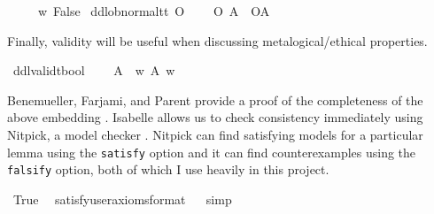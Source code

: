 \begin{isabellebody}
\ \ \ {\isachardoublequoteopen}\isactrlbold {\isasymbottom}\ {\isasymequiv}\ {\isasymlambda}w{\isachardot}\ False{\isachardoublequoteclose}\isanewline
{}\isamarkupfalse%
\ ddlob{\isacharunderscore}normal{\isacharcolon}{\isacharcolon}{\isachardoublequoteopen}t{\isasymRightarrow}t{\isachardoublequoteclose}\ {\isacharparenleft}{\isachardoublequoteopen}O\ {\isacharbraceleft}{\isacharunderscore}{\isacharbraceright}{\isachardoublequoteclose}{\isacharparenright}\isanewline
\ \ \ {\isachardoublequoteopen}{\isacharparenleft}O\ {\isacharbraceleft}A{\isacharbraceright}{\isacharparenright}\ {\isasymequiv}\ {\isacharparenleft}O{\isacharbraceleft}A{\isacharbar}\isactrlbold {\isasymtop}{\isacharbraceright}{\isacharparenright}\ {\isachardoublequoteclose}\isanewline
%
%
\begin{isamarkuptext}%
Finally, validity will be useful when discussing metalogical/ethical properties.%
\end{isamarkuptext}\isamarkuptrue%
\isamarkupfalse%
\ ddlvalid{\isacharcolon}{\isacharcolon}{\isachardoublequoteopen}t{\isasymRightarrow}bool{\isachardoublequoteclose}\ {\isacharparenleft}{\isachardoublequoteopen}{\isasymTurnstile}{\isacharunderscore}{\isachardoublequoteclose}{\isacharparenright}\isanewline
\ \ \ {\isachardoublequoteopen}{\isasymTurnstile}A\ {\isasymequiv}\ {\isasymforall}w{\isachardot}\ A\ w{\isachardoublequoteclose}\isanewline
%
\isanewline
%
\begin{isamarkuptext}%
Benemueller, Farjami, and Parent provide a proof of the completeness of the above embedding \citep{BFP}.
Isabelle allows us to check consistency immediately using Nitpick, a model checker \citep{nitpick}.
Nitpick can find satisfying models for a particular lemma using the \texttt{satisfy} option and it can 
find counterexamples using the \texttt{falsify} option, both of which I use heavily in this project.%
\end{isamarkuptext}\isamarkuptrue%
\isamarkupfalse%
\ True\ \isamarkupfalse%
\ {\isacharbrackleft}satisfy{\isacharcomma}user{\isacharunderscore}axioms{\isacharcomma}format{\isacharequal}{}{\isacharbrackright}%
\isadelimproof
\ %
\endisadelimproof
%
\isatagproof
{}\isamarkupfalse%
\ simp\isanewline
%
\isanewline
%
\end{isabellebody}
